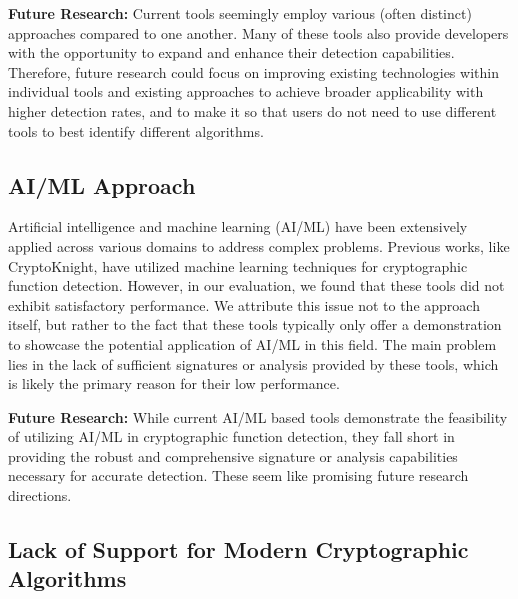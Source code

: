 \begin{takeaway}
\textbf{Future Research:} Current tools seemingly employ various (often distinct) approaches compared to one another. Many of these tools also provide developers with the opportunity to expand and enhance their detection capabilities. Therefore, future research could focus on improving existing technologies within individual tools and existing approaches to achieve broader applicability with higher detection rates, and to make it so that users do not need to use different tools to best identify different algorithms.
\end{takeaway}

\subsection{AI/ML Approach}
Artificial intelligence and machine learning (AI/ML) have been extensively applied across various domains to address complex problems. Previous works, like CryptoKnight, have utilized machine learning techniques for cryptographic function detection. However, in our evaluation, we found that these tools did not exhibit satisfactory performance. We attribute this issue not to the approach itself, but rather to the fact that these tools typically only offer a demonstration to showcase the potential application of AI/ML in this field. The main problem lies in the lack of sufficient signatures or analysis provided by these tools, which is likely the primary reason for their low performance.
\begin{takeaway}
\textbf{Future Research:} 
While current AI/ML based tools demonstrate the feasibility of utilizing AI/ML in cryptographic function detection, they fall short in providing the robust and comprehensive signature or analysis capabilities necessary for accurate detection.  These seem like promising future research directions.
\end{takeaway}

\subsection{Lack of Support for Modern Cryptographic Algorithms}

